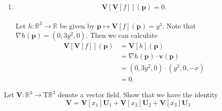 \documentclass[12 pt, letterpaper]{hmcpset}
\begin{document}
\begin{solution}
\begin{enumerate}
\[\begin{split}
									& = 2 (x y^2, x^2 y, 3z^5) \cdot (y^2, 0, -x) \\
									& = 2 x y^4 - 6 x z^5.
				\end{split}
			\]
		\item
			\[
				\boxed{
					\mathbf V[\mathbf V[f]] (\mathbf p) = 0.
				}
			\] \\
			Let $h : \mathbb R^3 \to \mathbb R$ be given by $\mathbf p \mapsto \mathbf V[f](\mathbf p) = y^3$. Note that $\nabla h(\mathbf p) = (0, 3y^2, 0)$. Then we can calculate
			\[
				\begin{split}
					\mathbf V[\mathbf V[f]](\mathbf p) & = \mathbf V[h](\mathbf p) \\
									   & = \nabla h(\mathbf p) \cdot \mathbf v(\mathbf p) \\
									   & = (0, 3y^2, 0) \cdot (y^2, 0, -x) \\
									   & = 0.
				\end{split}
			\]
	\end{enumerate}
\end{solution}

\pagebreak

\begin{problem}[Problem 3.]
	Let $\mathbf V : \mathbb R^3 \to \mathrm T \mathbb R^3$ denote a vector field. Show that we have the identity
	\[
		\mathbf V = \mathbf V[x_1] \mathbf U_1 + \mathbf V[x_2] \mathbf U_2 + \mathbf V[x_3] \mathbf U_3
	\]
\end{problem}
\end{document}
